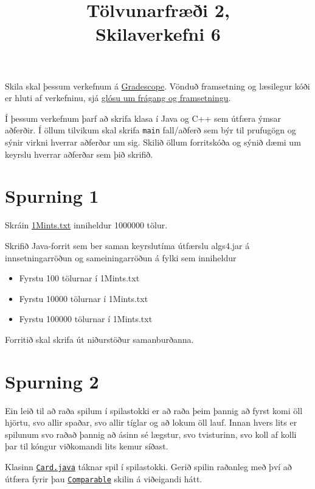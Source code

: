 \documentclass{article}
\title{Tölvunarfræði 2, \semester \\ Skilaverkefni 6}
\author{}
\begin{document}
\maketitle
{}

Skila skal þessum verkefnum á \href{https://gradescope.com/courses/5640}{Gradescope}. Vönduð framsetning og læsilegur kóði er hluti af verkefninu, sjá \href{https://piazza.com/class/ixkicfen49l111?cid=52}{glósu um frágang og framsetningu}.

Í þessum verkefnum þarf að skrifa klasa í Java og C++ sem útfæra ýmsar aðferðir. Í öllum tilvikum skal skrifa \texttt{main} fall/aðferð sem býr til prufugögn og sýnir virkni hverrar aðferðar um sig. Skilið öllum forritskóða og sýnið dæmi um keyrslu hverrar aðferðar sem þið skrifið.

\section{Spurning 1}
Skráin \href{http://algs4.cs.princeton.edu/14analysis/1Mints.txt}{1Mints.txt} inniheldur 1000000 tölur.

Skrifið Java-forrit sem ber saman keyrslutíma útfærslu algs4.jar á innsetningarröðun og sameiningarröðun á fylki sem inniheldur

\begin{itemize}
 \item Fyrstu 100 tölurnar í 1Mints.txt
 \item Fyrstu 10000 tölurnar í 1Mints.txt
 \item Fyrstu 100000 tölurnar í 1Mints.txt
\end{itemize}


Forritið skal skrifa út niðurstöður samanburðanna.

\section{Spurning 2}
Ein leið til að raða spilum í spilastokki er að raða þeim þannig að fyrst komi öll hjörtu, svo allir spaðar, svo allir tíglar og að lokum öll lauf. 
Innan hvers lits er spilunum svo raðað þannig að ásinn sé lægstur, svo tvisturinn, svo koll af kolli þar til kóngur viðkomandi lits kemur síðast.

Klasinn \href{https://raw.githubusercontent.com/Ernir/kennsluefni/master/T2/Code/w6/Card.java}{\texttt{Card.java}} táknar spil í spilastokki. 
Gerið spilin raðanleg með því að útfæra fyrir þau \texttt{\href{https://docs.oracle.com/javase/8/docs/api/java/lang/Comparable.html}{Comparable}} skilin á viðeigandi hátt.
\end{document}
